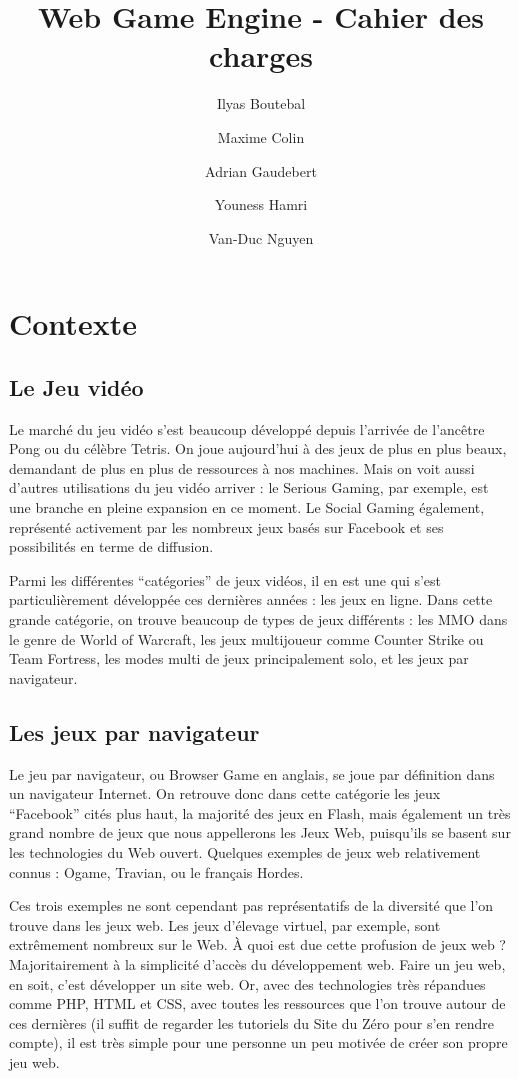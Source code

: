 \documentclass[a4paper,10pt]{report}
\title{Web Game Engine - Cahier des charges}
\author{Ilyas Boutebal \and Maxime Colin \and Adrian Gaudebert \and Youness Hamri \and Van-Duc Nguyen}
\begin{document}
  \maketitle
  \tableofcontents

  \chapter{Contexte}

    \section{Le Jeu vidéo}

      Le marché du jeu vidéo s’est beaucoup développé depuis l’arrivée de l’ancêtre Pong ou du célèbre Tetris. On joue aujourd’hui à des jeux de plus en plus beaux, demandant de plus en plus de ressources à nos machines. Mais on voit aussi d’autres utilisations du jeu vidéo arriver : le Serious Gaming, par exemple, est une branche en pleine expansion en ce moment. Le Social Gaming également, représenté activement par les nombreux jeux basés sur Facebook et ses possibilités en terme de diffusion.

      Parmi les différentes ``catégories'' de jeux vidéos, il en est une qui s'est particulièrement développée ces dernières années : les jeux en ligne. Dans cette grande catégorie, on trouve beaucoup de types de jeux différents : les MMO dans le genre de World of Warcraft, les jeux multijoueur comme Counter Strike ou Team Fortress, les modes multi de jeux principalement solo, et les jeux par navigateur.

    \section{Les jeux par navigateur}

      Le jeu par navigateur, ou Browser Game en anglais, se joue par définition dans un navigateur Internet. On retrouve donc dans cette catégorie les jeux “Facebook” cités plus haut, la majorité des jeux en Flash, mais également un très grand nombre de jeux que nous appellerons les Jeux Web, puisqu’ils se basent sur les technologies du Web ouvert. Quelques exemples de jeux web relativement connus : Ogame, Travian, ou le français Hordes.

      Ces trois exemples ne sont cependant pas représentatifs de la diversité que l’on trouve dans les jeux web. Les jeux d’élevage virtuel, par exemple, sont extrêmement nombreux sur le Web. À quoi est due cette profusion de jeux web ? Majoritairement à la simplicité d’accès du développement web. Faire un jeu web, en soit, c’est développer un site web. Or, avec des technologies très répandues comme PHP, HTML et CSS, avec toutes les ressources que l’on trouve autour de ces dernières (il suffit de regarder les tutoriels du Site du Zéro pour s’en rendre compte), il est très simple pour une personne un peu motivée de créer son propre jeu web.
\end{document}
